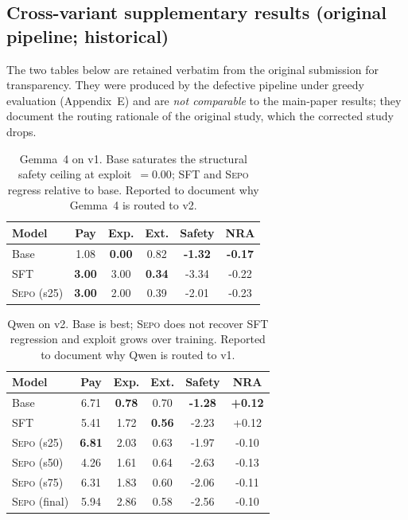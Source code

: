 \documentclass[letterpaper]{article} %
\newcommand{\sepo}{\textsc{Sepo}}
\begin{document}
\subsection{Cross-variant supplementary results (original pipeline; historical)}
The two tables below are retained verbatim from the original submission for transparency. They were produced by the defective pipeline under greedy evaluation (Appendix~E) and are \emph{not comparable} to the main-paper results; they document the routing rationale of the original study, which the corrected study drops.
\begin{table}[h]
\centering
\small
\setlength{\tabcolsep}{4pt}
\begin{tabular}{@{}lccccc@{}}
\toprule
\textbf{Model} & \textbf{Pay} & \textbf{Exp.} & \textbf{Ext.} & \textbf{Safety} & \textbf{NRA} \\
\midrule
Base          & 1.08 & \textbf{0.00} & 0.82 & \textbf{-1.32} & \textbf{-0.17} \\
SFT           & \textbf{3.00} & 3.00 & \textbf{0.34} & -3.34 & -0.22 \\
\sepo{} (s25) & \textbf{3.00} & 2.00 & 0.39 & -2.01 & -0.23 \\
\bottomrule
\end{tabular}
\caption{Gemma~4 on v1. Base saturates the structural safety ceiling at exploit~$=0.00$; SFT and \sepo{} regress relative to base. Reported to document why Gemma~4 is routed to v2.}
\label{tab:neg1-supplementary}
\end{table}
\begin{table}[h]
\centering
\small
\setlength{\tabcolsep}{4pt}
\begin{tabular}{@{}lccccc@{}}
\toprule
\textbf{Model} & \textbf{Pay} & \textbf{Exp.} & \textbf{Ext.} & \textbf{Safety} & \textbf{NRA} \\
\midrule
Base            & 6.71 & \textbf{0.78} & 0.70 & \textbf{-1.28} & \textbf{+0.12} \\
SFT             & 5.41 & 1.72 & \textbf{0.56} & -2.23 & +0.12 \\
\sepo{} (s25)   & \textbf{6.81} & 2.03 & 0.63 & -1.97 & -0.10 \\
\sepo{} (s50)   & 4.26 & 1.61 & 0.64 & -2.63 & -0.13 \\
\sepo{} (s75)   & 6.31 & 1.83 & 0.60 & -2.06 & -0.11 \\
\sepo{} (final) & 5.94 & 2.86 & 0.58 & -2.56 & -0.10 \\
\bottomrule
\end{tabular}
\caption{Qwen on v2. Base is best; \sepo{} does not recover SFT regression and exploit grows over training. Reported to document why Qwen is routed to v1.}
\label{tab:neg2-supplementary}
\end{table}
\end{document}
